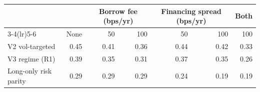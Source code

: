 \begin{tabular}{lrrrrrr}
\toprule
& & \multicolumn{2}{c}{Borrow fee (bps/yr)} & \multicolumn{2}{c}{Financing spread (bps/yr)} & Both \\
\cmidrule(lr){3-4}\cmidrule(lr){5-6}
 & None & 50 & 100 & 50 & 100 & 100 \\
\midrule
V2 vol-targeted & 0.45 & 0.41 & 0.36 & 0.44 & 0.42 & 0.33 \\
V3 regime (R1) & 0.39 & 0.35 & 0.31 & 0.37 & 0.35 & 0.26 \\
Long-only risk parity & 0.29 & 0.29 & 0.29 & 0.24 & 0.19 & 0.19 \\
\bottomrule
\end{tabular}
